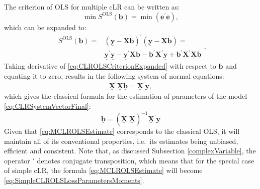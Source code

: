 \documentclass[
]{book}
\begin{document}
The criterion of OLS for multiple cLR can be written as:
\begin{equation}
    \min S^{\mathrm{OLS}}(\underline{\boldsymbol{b}}) = \min \left(\underline{\mathbf{e}}^\prime \underline{\mathbf{e}}\right),
    \label{eq:CLROLSCriterion}
\end{equation}
which can be expanded to:
\begin{equation}
    \begin{aligned}
    S^{\mathrm{OLS}}(\underline{\boldsymbol{b}}) = & \left( \underline{\mathbf{y}} - \underline{\mathbf{X}} \underline{\boldsymbol{b}} \right)^\prime \left( \underline{\mathbf{y}} - \underline{\mathbf{X}} \underline{\boldsymbol{b}} \right) = \\
    & \underline{\mathbf{y}}^\prime \underline{\mathbf{y}} - \underline{\mathbf{y}}^\prime \underline{\mathbf{X}} \underline{\boldsymbol{b}} - \underline{\boldsymbol{b}}^\prime \underline{\mathbf{X}}^\prime \underline{\mathbf{y}} + \underline{\boldsymbol{b}}^\prime \underline{\mathbf{X}}^\prime \underline{\mathbf{X}} \underline{\boldsymbol{b}}
    \end{aligned}. 
    \label{eq:CLROLSCriterionExpanded}
\end{equation}
Taking derivative of \eqref{eq:CLROLSCriterionExpanded} with respect to \(\underline{\boldsymbol{b}}\) and equating it to zero, results in the following system of normal equations:
\begin{equation}
    \underline{\mathbf{X}}^\prime \underline{\mathbf{X}} \underline{\boldsymbol{b}} = \underline{\mathbf{X}}^\prime \underline{\mathbf{y}} ,
    \label{eq:CLROLSSystemOfNormalEquations}
\end{equation}
which gives the classical formula for the estimation of parameters of the model \eqref{eq:CLRSystemVectorFinal}:
\begin{equation}
    \underline{\boldsymbol{b}} = \left( \underline{\mathbf{X}}^\prime \underline{\mathbf{X}} \right)^{-1} \underline{\mathbf{X}}^\prime \underline{\mathbf{y}}
    \label{eq:MCLROLSEstimate}
\end{equation}
Given that \eqref{eq:MCLROLSEstimate} corresponds to the classical OLS, it will maintain all of its conventional properties, i.e.~its estimates being unbiased, efficient and consistent. Note that, as discussed Subsection \ref{complexVariable}, the operator \(\prime\) denotes conjugate transposition, which means that for the special case of simple cLR, the formula \eqref{eq:MCLROLSEstimate} will become \eqref{eq:SimpleCLROLSLossParametersMoments}.
\end{document}
